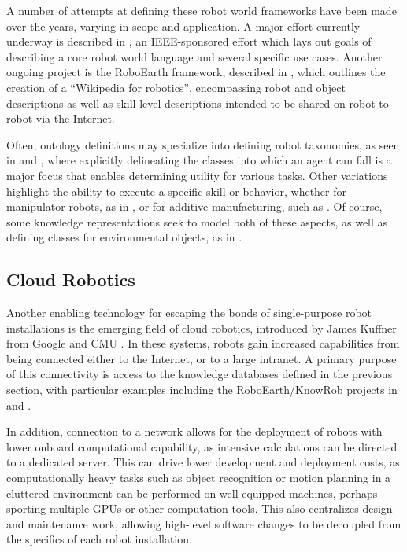 A number of attempts at defining these robot world frameworks have been made over the years, varying in scope and application. A major effort currently underway is described in
\cite{Schlenoff2012a}, %
an IEEE-sponsored effort which lays out goals of describing a core robot world language and several specific use cases.
Another ongoing project is the RoboEarth framework, described in
\cite{Tenorth2013a},
which outlines the creation of a ``Wikipedia for robotics'', encompassing robot and object descriptions as well as skill level descriptions intended to be shared on robot-to-robot via the Internet.

Often, ontology definitions may specialize into defining robot taxonomies, as seen in
\cite{Schlenoff2005a} %
and
\cite{Schlenoff2005},
where explicitly delineating the classes into which an agent can fall is a major focus that enables determining utility for various tasks.
Other variations highlight the ability to execute a specific skill or behavior, whether for manipulator robots, as in
\cite{Huckaby2013},
or for additive manufacturing, such as
\cite{Liu2010}. %
Of course, some knowledge representations seek to model both of these aspects, as well as defining classes for environmental objects, as in
\cite{Tenorth2013}. %
\subsection{Cloud Robotics}
Another enabling technology for escaping the bonds of single-purpose robot installations is the emerging field of cloud robotics, introduced by James Kuffner from Google and CMU \cite{Guizzo2011}. In these systems, robots gain increased capabilities from being connected either to the Internet, or to a large intranet. A primary purpose of this connectivity is access to the knowledge databases defined in the previous section, with particular examples including the RoboEarth/KnowRob projects in
\cite{Tenorth2013} %
and
\cite{Tenorth2013a}.

In addition, connection to a network allows for the deployment of robots with lower onboard computational capability, as intensive calculations can be directed to a dedicated server. This can drive lower development and deployment costs, as computationally heavy tasks such as object recognition \cite{Kehoe2013} or motion planning in a cluttered environment \cite{Hunziker2013} can be performed on well-equipped machines, perhaps sporting multiple GPUs or other computation tools. This also centralizes design and maintenance work, allowing high-level software changes to be decoupled from the specifics of each robot installation.

